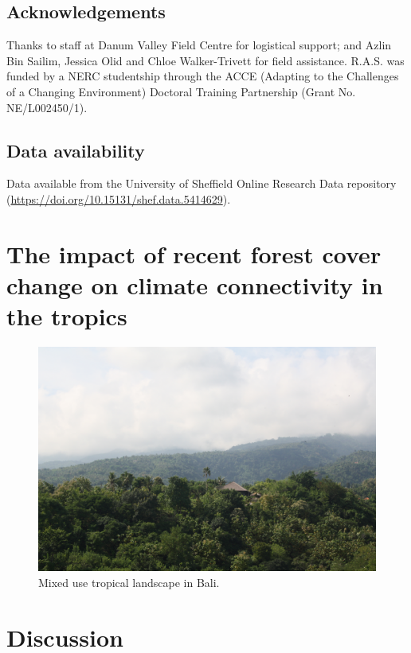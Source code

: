 \documentclass[12pt,a4paper,]{report}
\theoremstyle{definition}
\theoremstyle{definition}
\theoremstyle{definition}
\theoremstyle{remark}
\begin{document}
\section{Acknowledgements}\label{acknowledgements-1}

Thanks to staff at Danum Valley Field Centre for logistical support; and
Azlin Bin Sailim, Jessica Olid and Chloe Walker-Trivett for field
assistance. R.A.S. was funded by a NERC studentship through the ACCE
(Adapting to the Challenges of a Changing Environment) Doctoral Training
Partnership (Grant No. NE/L002450/1).

\section{Data availability}\label{data-availability}

Data available from the University of Sheffield Online Research Data
repository (\url{https://doi.org/10.15131/shef.data.5414629}).

\chapter{The impact of recent forest cover change on climate
connectivity in the
tropics}\label{the-impact-of-recent-forest-cover-change-on-climate-connectivity-in-the-tropics}

\begin{figure}[!htb]
\centering
\includegraphics[width=15cm]{pics/landscape1.jpg}
\caption*{Mixed use tropical landscape in Bali.}
\end{figure}

\pagebreak

\chapter{Discussion}\label{discussion-2}
\end{document}
